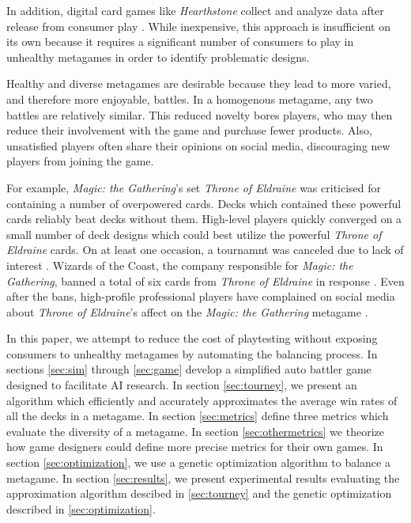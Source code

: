 In addition, digital card games like \textit{Hearthstone} collect and
analyze data after release from consumer play
\cite{blizzard-gamebalancetalk-keg2019}. While inexpensive, this
approach is insufficient on its own because it requires a significant
number of consumers to play in unhealthy metagames in order to
identify problematic designs.


Healthy and diverse metagames are desirable because they lead to more
varied, and therefore more enjoyable, battles. In a homogenous
metagame, any two battles are relatively similar. This reduced novelty
bores players, who may then reduce their involvement with the game and
purchase fewer products. Also, unsatisfied players often share their
opinions on social media, discouraging new players from joining the
game.


For example, \textit{Magic: the Gathering}'s set \textit{Throne of
  Eldraine} was criticised for containing a number of overpowered
cards. Decks which contained these powerful cards reliably beat decks
without them. High-level players quickly converged on a small number
of deck designs which could best utilize the powerful \textit{Throne
  of Eldraine} cards. On at least one occasion, a tournamnt was
canceled due to lack of interest \cite{oko-meta-drama}. Wizards of the
Coast, the company responsible for \textit{Magic: the Gathering},
banned a total of six cards from \textit{Throne of Eldraine} in
response \cite{mtg-banlist, mtg-bnr-nov-2019, mtg-bnr-jun-2020,
  mtg-bnr-aug-2020}. Even after the bans, high-profile professional
players have complained on social media about \textit{Throne of
  Eldraine}'s affect on the \textit{Magic: the Gathering} metagame
\cite{lsv-eldraine-complaints}.


In this paper, we attempt to reduce the cost of playtesting without
exposing consumers to unhealthy metagames by automating the balancing
process. In sections \ref{sec:sim} through \ref{sec:game} develop a
simplified auto battler game designed to facilitate AI research. In
section \ref{sec:tourney}, we present an algorithm which efficiently
and accurately approximates the average win rates of all the decks in
a metagame. In section \ref{sec:metrics} define three metrics which
evaluate the diversity of a metagame. In section
\ref{sec:othermetrics} we theorize how game designers could define
more precise metrics for their own games. In section
\ref{sec:optimization}, we use a genetic optimization algorithm to
balance a metagame. In section \ref{sec:results}, we present
experimental results evaluating the approximation algorithm descibed
in \ref{sec:tourney} and the genetic optimization described in
\ref{sec:optimization}.

